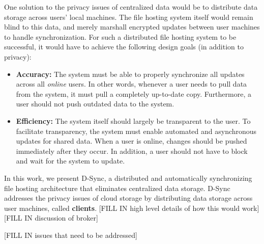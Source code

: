 One solution to the privacy issues of centralized data would be to distribute
data storage across users' local machines.
The file hosting system itself would remain blind to this data, 
and merely marshall encrypted updates between user machines to handle synchronization.
For such a distributed file hosting system to be successful, it would have to achieve
the following design goals (in addition to privacy):
\begin{itemize}
    \item \textbf{Accuracy:} The system must be able to properly synchronize all updates across all \emph{online} users. In other words, whenever a user needs to pull
    data from the system, it must pull a completely up-to-date copy.  Furthermore, a user should not push outdated data to the system.
    \item \textbf{Efficiency:} The system itself should largely be transparent to the user. 
    To facilitate transparency, the system must enable automated and asynchronous updates for shared data. When a user is online,
    changes should be pushed immediately after they occur. In addition, a user should not have to block and wait for the system to update.
\end{itemize}

In this work, we present D-Sync, a distributed and automatically synchronizing file hosting
architecture that eliminates centralized data storage.
D-Sync addresses the privacy issues of cloud storage
by distributing data storage across user machines, called \textbf{clients}.
[FILL IN high level details of how this would work]
[FILL IN discussion of broker]

[FILL IN issues that need to be addressed]


